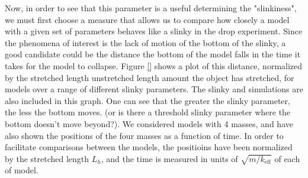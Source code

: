 \documentclass[prb,preprint,superscriptaddress]{revtex4-1}
\begin{document}
Now, in order to see that this parameter is a useful determining the "slinkiness", we must first choose a measure that allows us to compare how closely a model
with a given set of parameters behaves like a slinky in the drop experiment.  Since the phenomena of interest is the lack of motion of the bottom of the slinky, 
a good candidate could be the distance the bottom of the model falls in the time it takes for the model to collapse.  Figure \ref{} shows a plot of this distance, normalized by the stretched length unstretched length amount the object has stretched, for models over a range of different slinky parameters.  The slinky and simulations are also included in this graph.  One can see that the greater the slinky parameter, the less the bottom moves.  (or is there a threshold slinky parameter where  the bottom doesn't move beyond?).  We considered models with 4 masses, and have also shown the positions of the four masses as a function of time.  In order to facilitate comparisons between the models, the positioins have been normalized by the stretched length $L_h$, and the time is measured in units of $\sqrt{m/k_{\text{eff}}}$ of each of model.  

\end{document}
